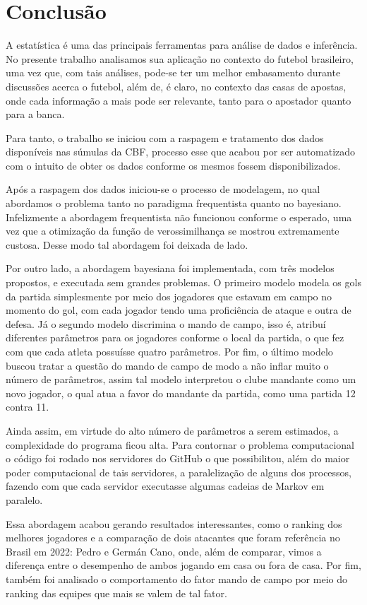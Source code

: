 \chapter{Conclusão}

A estatística é uma das principais ferramentas para análise de dados e inferência. No presente trabalho analisamos sua aplicação no contexto do futebol brasileiro, uma vez que, com tais análises, pode-se ter um melhor embasamento durante discussões acerca o futebol, além de, é claro, no contexto das casas de apostas, onde cada informação a mais pode ser relevante, tanto para o apostador quanto para a banca.

Para tanto, o trabalho se iniciou com a raspagem e tratamento dos dados disponíveis nas súmulas da CBF, processo esse que acabou por ser automatizado com o intuito de obter os dados conforme os mesmos fossem disponibilizados.

Após a raspagem dos dados iniciou-se o processo de modelagem, no qual abordamos o problema tanto no paradigma frequentista quanto no bayesiano. Infelizmente a abordagem frequentista não funcionou conforme o esperado, uma vez que a otimização da função de verossimilhança se mostrou extremamente custosa. Desse modo tal abordagem foi deixada de lado.

Por outro lado, a abordagem bayesiana foi implementada, com três modelos propostos, e executada sem grandes problemas. O primeiro modelo modela os gols da partida simplesmente por meio dos jogadores que estavam em campo no momento do gol, com cada jogador tendo uma proficiência de ataque e outra de defesa. Já o segundo modelo discrimina o mando de campo, isso é, atribuí diferentes parâmetros para os jogadores conforme o local da partida, o que fez com que cada atleta possuísse quatro parâmetros. Por fim, o último modelo buscou tratar a questão do mando de campo de modo a não inflar muito o número de parâmetros, assim tal modelo interpretou o clube mandante como um novo jogador, o qual atua a favor do mandante da partida, como uma partida 12 contra 11.

Ainda assim, em virtude do alto número de parâmetros a serem estimados, a complexidade do programa ficou alta. Para contornar o problema computacional o código foi rodado nos servidores do GitHub o que possibilitou, além do maior poder computacional de tais servidores, a paralelização de alguns dos processos, fazendo com que cada servidor executasse algumas cadeias de Markov em paralelo.

Essa abordagem acabou gerando resultados interessantes, como o ranking dos melhores jogadores e a comparação de dois atacantes que foram referência no Brasil em 2022: Pedro e Germán Cano, onde, além de comparar, vimos a diferença entre o desempenho de ambos jogando em casa ou fora de casa. Por fim, também foi analisado o comportamento do fator mando de campo por meio do ranking das equipes que mais se valem de tal fator.

